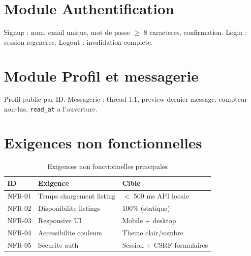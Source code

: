 \animChatbot
{}

\section{Module Authentification}

Signup : nom, email unique, mot de passe $\geq$ 8 caracteres, confirmation. Login : session regeneree. Logout : invalidation complete.

\animAuthFlow
{}

\section{Module Profil et messagerie}

Profil public par ID. Messagerie : thread 1:1, preview dernier message, compteur non-lus, \texttt{read\_at} a l'ouverture.


\animMessaging
{}

\section{Exigences non fonctionnelles}

\begin{table}[H]
\centering
\caption{Exigences non fonctionnelles principales}
\begin{tabular}{@{}lll@{}}
\toprule
\textbf{ID} & \textbf{Exigence} & \textbf{Cible} \\
\midrule
NFR-01 & Temps chargement listing & $<$ 500 ms API locale \\
NFR-02 & Disponibilite listings & 100\% (statique) \\
NFR-03 & Responsive UI & Mobile + desktop \\
NFR-04 & Accessibilite couleurs & Theme clair/sombre \\
NFR-05 & Securite auth & Session + CSRF formulaires \\
\bottomrule
\end{tabular}
\end{table}
